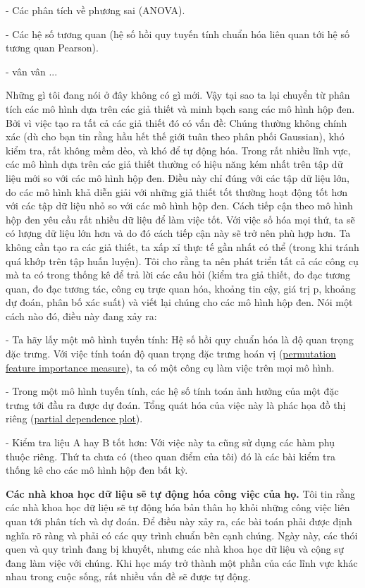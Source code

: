 - Các phân tích về phương sai (ANOVA).

- Các hệ số tương quan (hệ số hồi quy tuyến tính chuẩn hóa liên quan tới hệ số tương quan Pearson).

- vân vân ...

Những gì tôi đang nói ở đây không có gì mới. Vậy tại sao ta lại chuyển từ phân tích các mô hình dựa trên các giả thiết và  minh bạch sang các mô hình hộp đen. Bởi vì việc tạo ra tất cả các giả thiết đó có vấn đề: Chúng thường không chính xác (dù cho bạn tin rằng hầu hết thế giới tuân theo phân phối Gaussian), khó kiểm tra, rất không mềm dẻo, và khó để tự động hóa. Trong rất nhiều lĩnh vực, các mô hình dựa trên các giả thiết thường có hiệu năng kém nhất trên tập dữ liệu mới so với các mô hình hộp đen. Điều này chỉ đúng với các tập dữ liệu lớn, do các mô hình khả diễn giải với những giả thiết tốt thường hoạt động tốt hơn với các tập dữ liệu nhỏ so với các mô hình hộp đen. Cách tiếp cận theo mô hình hộp đen yêu cầu rất nhiều dữ liệu để làm việc tốt. Với việc số hóa mọi thứ, ta sẽ có lượng dữ liệu lớn hơn và do đó cách tiếp cận này sẽ trở nên phù hợp hơn. Ta không cần tạo ra các giả thiết, ta xấp xỉ thực tế gần nhất có thể (trong khi tránh quá khớp trên tập huấn luyện). Tôi cho rằng ta nên phát triển tất cả các công cụ mà ta có trong thống kê để trả lời các câu hỏi (kiểm tra giả thiết, đo đạc tương quan, đo đạc tương tác, công cụ trực quan hóa, khoảng tin cậy, giá trị p, khoảng dự đoán, phân bố xác suất) và viết lại chúng cho các mô hình hộp đen. Nói một cách nào đó, điều này đang xảy ra:

- Ta hãy lấy một mô hình tuyến tính: Hệ số hồi quy chuẩn hóa là độ quan trọng đặc trưng. Với việc tính toán độ quan trọng đặc trưng hoán vị (\href{https://christophm.github.io/interpretable-ml-book/feature-importance.html}{permutation feature importance measure}), ta có một công cụ làm việc trên mọi mô hình.

- Trong một mô hình tuyến tính, các hệ số tính toán ảnh hưởng của một đặc trưng tới đầu ra được dự đoán. Tổng quát hóa của việc này là phác họa đồ thị riêng (\href{https://christophm.github.io/interpretable-ml-book/pdp.html}{partial dependence plot}).

- Kiểm tra liệu A hay B tốt hơn: Với việc này ta cũng sử dụng các hàm phụ thuộc riêng. Thứ ta chưa có (theo quan điểm của tôi) đó là các bài kiểm tra thống kê cho các mô hình hộp đen bất kỳ.

\textbf{Các nhà khoa học dữ liệu sẽ tự động hóa công việc của họ.}
Tôi tin rằng các nhà khoa học dữ liệu sẽ tự động hóa bản thân họ khỏi những công việc liên quan tới phân tích và dự đoán. Để điều này xảy ra, các bài toán phải được định nghĩa rõ ràng và phải có các quy trình chuẩn bên cạnh chúng. Ngày này, các thói quen và quy trình đang bị khuyết, nhưng các nhà khoa học dữ liệu và cộng sự đang làm việc với chúng. Khi học máy trở thành một phần của các lĩnh vực khác nhau trong cuộc sống, rất nhiều vấn đề sẽ được tự động.

